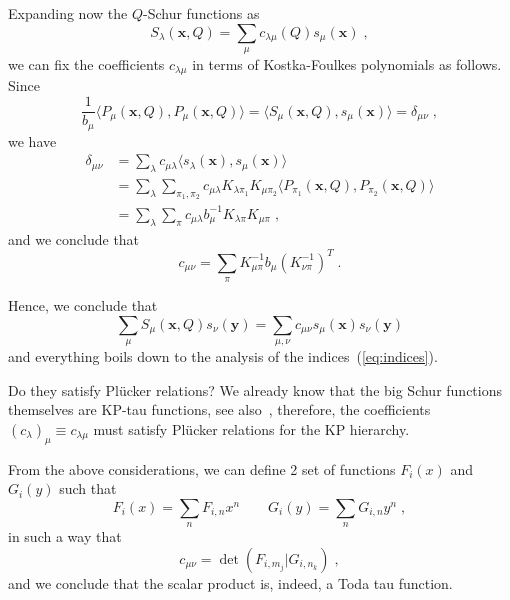 \documentclass[a4paper,11pt]{amsart}
\begin{document}
Expanding now the \(Q\)-Schur functions as
\begin{equation}
  S_\lambda(\bm{x}, Q) = \sum_{\mu} c_{\lambda\mu}(Q) s_\mu(\bm{x})\; ,
\end{equation}
we can fix the coefficients \(c_{\lambda\mu}\) in terms of Kostka-Foulkes
polynomials as follows. Since~\cite{Macdonald:1998} 
\begin{equation}
  \frac{1}{b_\mu}\langle P_\mu(\bm{x}, Q), P_\mu(\bm{x}, Q)\rangle = \langle
  S_\mu(\bm{x}, Q), s_\mu(\bm{x})\rangle = \delta_{\mu\nu}\; ,  
\end{equation}
we have
\begin{equation}
  \begin{split}
\delta_{\mu\nu} & = \sum_\lambda c_{\mu\lambda}  \langle s_\lambda(\bm{x}), s_\mu(\bm{x})\rangle\\
& = \sum_\lambda \sum_{\pi_1, \pi_2} c_{\mu\lambda}  K_{\lambda \pi_1} K_{\mu \pi_2}
\langle P_{\pi_1}(\bm{x}, Q), P_{\pi_2}(\bm{x}, Q)\rangle \\ 
& = \sum_\lambda \sum_{\pi} c_{\mu\lambda} b_{\mu}^{-1}  K_{\lambda \pi} K_{\mu \pi}\; ,
  \end{split}
\end{equation}
and we conclude that 
\begin{equation}
\label{eq:indices}
c_{\mu \nu} = \sum_\pi K_{\mu\pi}^{-1} b_\mu (K_{\nu\pi}^{-1})^T\; .
\end{equation}

Hence, we conclude that 
\begin{equation}
\sum_{\mu} S_{\mu}(\bm{x},Q) s_{\nu}(\bm{y}) = 
\sum_{\mu , \nu} c_{\mu\nu} s_{\mu}(\bm{x}) s_{\nu}(\bm{y}) 
\end{equation}
and everything boils down to the analysis of the
indices~(\ref{eq:indices}).

Do they satisfy Plücker relations? We already know that the
big Schur functions themselves are KP-tau
functions, see also~\cite{Necoechea:2019wbg}, therefore, the coefficients
\((c_\lambda)_\mu \equiv c_{\lambda\mu}\) must satisfy Plücker relations
for the KP hierarchy.

From the above considerations, we can define 2 set of functions \(F_i(x)\) and
\(G_i(y)\) such that
\begin{equation}
 F_i(x) = \sum_{n} F_{i,n} x^n \qquad 
 G_i(y) = \sum_{n} G_{i,n} y^n\; ,
\end{equation}
in such a way that 
\begin{equation}
  c_{\mu\nu} = \det(F_{i, m_j} | G_{i, n_k})\; ,
\end{equation}
and we conclude that the scalar product is, indeed, a Toda tau function. 
 
\end{document}
